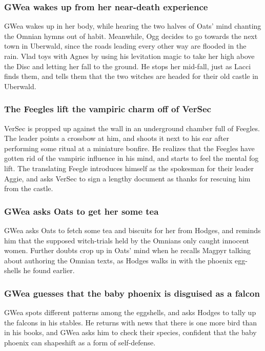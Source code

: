 \subsubsection{\Gls{GWea} wakes up from her near-death experience}
\Gls{GWea} wakes up in her body, while hearing the two halves of \Gls{Oats}' mind chanting the
Omnian hymns out of habit. Meanwhile, \Gls{Ogg} decides to go towards the next town in Uberwald,
since the roads leading every other way are flooded in the rain. \Gls{Vlad} toys with \Gls{Agnes}
by using his levitation magic to take her high above the Disc and letting her fall to the ground.
He stops her mid-fall, just as \Gls{Lacci} finds them, and tells them that the two witches are
headed for their old castle in Uberwald.

\subsubsection{The Feegles lift the vampiric charm off of \Gls{VerSec}}
\Gls{VerSec} is propped up against the wall in an underground chamber full of Feegles. The leader
points a crossbow at him, and shoots it next to his ear after performing some ritual at a miniature
bonfire. He realizes that the Feegles have gotten rid of the vampiric influence in his mind, and
starts to feel the mental fog lift. The translating Feegle introduces himself as the spokesman for
their leader \Gls{Aggie}, and asks \Gls{VerSec} to sign a lengthy document as thanks for rescuing
him from the castle.

\subsubsection{\Gls{GWea} asks \Gls{Oats} to get her some tea}
\Gls{GWea} asks \Gls{Oats} to fetch some tea and biscuits for her from \Gls{Hodges}, and reminds
him that the supposed witch-trials held by the Omnians only caught innocent women. Further doubts
crop up in \Gls{Oats}' mind when he recalls \Gls{Magpyr} talking about authoring the Omnian texts,
as \Gls{Hodges} walks in with the phoenix egg-shells he found earlier.

\subsubsection{\Gls{GWea} guesses that the baby phoenix is disguised as a falcon}
\Gls{GWea} spots different patterns among the eggshells, and asks \Gls{Hodges} to tally up the
falcons in his stables. He returns with news that there is one more bird than in his books, and
\Gls{GWea} asks him to check their species, confident that the baby phoenix can shapeshift as a form
of self-defense.

